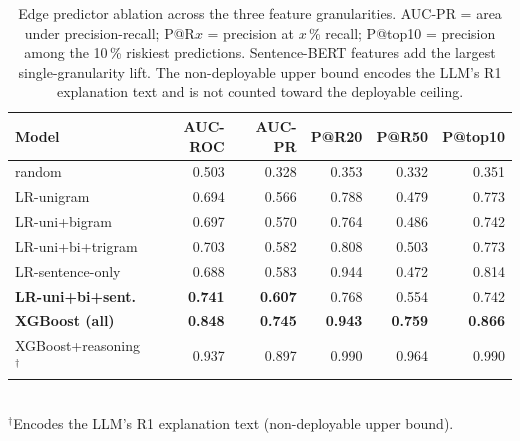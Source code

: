 \begin{table}[t]
\centering
\small
\caption{Edge predictor ablation across the three feature
granularities. AUC-PR = area under precision-recall;
P@R$x$ = precision at $x$\,\% recall; P@top10 = precision among the
10\,\% riskiest predictions. Sentence-BERT features add the largest
single-granularity lift. The non-deployable upper bound encodes the
LLM's R1 explanation text and is not counted toward the deployable
ceiling.}
\label{tab:predictor}
\begin{tabular}{lrrrrr}
\toprule
Model & AUC-ROC & AUC-PR & P@R20 & P@R50 & P@top10 \\
\midrule
random              & 0.503 & 0.328 & 0.353 & 0.332 & 0.351 \\
LR-unigram          & 0.694 & 0.566 & 0.788 & 0.479 & 0.773 \\
LR-uni+bigram       & 0.697 & 0.570 & 0.764 & 0.486 & 0.742 \\
LR-uni+bi+trigram   & 0.703 & 0.582 & 0.808 & 0.503 & 0.773 \\
LR-sentence-only    & 0.688 & 0.583 & 0.944 & 0.472 & 0.814 \\
\textbf{LR-uni+bi+sent.} & \textbf{0.741} & \textbf{0.607} & 0.768 & 0.554 & 0.742 \\
\textbf{XGBoost (all)}   & \textbf{0.848} & \textbf{0.745} & \textbf{0.943} & \textbf{0.759} & \textbf{0.866} \\
\midrule
XGBoost+reasoning$^\dagger$ & 0.937 & 0.897 & 0.990 & 0.964 & 0.990 \\
\bottomrule
\end{tabular}
\\[2pt]
\footnotesize $^\dagger$Encodes the LLM's R1 explanation text
(non-deployable upper bound).
\end{table}
